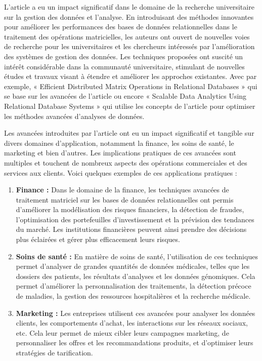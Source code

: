 \documentclass[a4paper, 12pt]{article}
\begin{document}
L'article a eu un impact significatif dans le domaine de la recherche universitaire sur la gestion des données et l'analyse. En introduisant des méthodes innovantes pour améliorer les performances des bases de données relationnelles dans le traitement des opérations matricielles, les auteurs ont ouvert de nouvelles voies de recherche pour les universitaires et les chercheurs intéressés par l'amélioration des systèmes de gestion des données. Les techniques proposées ont suscité un intérêt considérable dans la communauté universitaire, stimulant de nouvelles études et travaux visant à étendre et améliorer les approches existantes. Avec par exemple,  « Efficient Distributed Matrix Operations in Relational Databases » qui se base sur les avancées de l’article ou encore « Scalable Data Analytics Using Relational Database Systems » qui utilise les concepts de l’article pour optimiser les méthodes avancées d’analyses de données.

Les avancées introduites par l'article ont eu un impact significatif et tangible sur divers domaines d'application, notamment la finance, les soins de santé, le marketing et bien d’autres. Les implications pratiques de ces avancées sont multiples et touchent de nombreux aspects des opérations commerciales et des services aux clients. Voici quelques exemples de ces applications pratiques :

\begin{enumerate}[label={-}]
	\item \textbf{Finance :} Dans le domaine de la finance, les techniques avancées de traitement matriciel sur les bases de données relationnelles ont permis d'améliorer la modélisation des risques financiers, la détection de fraudes, l'optimisation des portefeuilles d'investissement et la prévision des tendances du marché. Les institutions financières peuvent ainsi prendre des décisions plus éclairées et gérer plus efficacement leurs risques.
	\item \textbf{Soins de santé :} En matière de soins de santé, l'utilisation de ces techniques permet d'analyser de grandes quantités de données médicales, telles que les dossiers des patients, les résultats d'analyses et les données génomiques. Cela permet d'améliorer la personnalisation des traitements, la détection précoce de maladies, la gestion des ressources hospitalières et la recherche médicale.
	\item \textbf{Marketing :} Les entreprises utilisent ces avancées pour analyser les données clients, les comportements d'achat, les interactions sur les réseaux sociaux, etc. Cela leur permet de mieux cibler leurs campagnes marketing, de personnaliser les offres et les recommandations produits, et d'optimiser leurs stratégies de tarification.
\end{enumerate}
\end{document}
